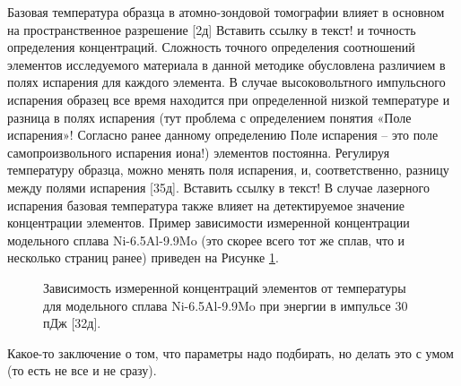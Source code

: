 Базовая температура образца в атомно-зондовой томографии влияет в основном на пространственное разрешение [2д] Вставить ссылку в текст! и точность определения концентраций. Сложность точного определения соотношений элементов исследуемого материала в данной методике обусловлена различием в полях испарения для каждого элемента. В случае высоковольтного импульсного испарения образец все время находится при определенной низкой температуре и разница в полях испарения (тут проблема с определением понятия «Поле испарения»! Согласно ранее данному определению Поле испарения – это поле самопроизвольного испарения иона!) элементов постоянна. Регулируя температуру образца, можно менять поля испарения, и, соответственно, разницу между полями испарения [35д]. Вставить ссылку в текст!
В случае лазерного испарения базовая температура также влияет на детектируемое значение концентрации элементов. Пример зависимости измеренной концентрации модельного сплава Ni-6.5Al-9.9Mo (это скорее всего тот же сплав, что и несколько страниц ранее) приведен на Рисунке \cref{fig:ParamsTemperatureComposition}.

\begin{figure}[htb]
	\caption{Зависимость измеренной концентраций элементов от температуры для модельного сплава Ni-6.5Al-9.9Mo при энергии в импульсе 30 пДж [32д]. }
	\label{fig:ParamsTemperatureComposition}
\end{figure}



\FloatBarrier

Какое-то заключение о том, что параметры надо подбирать, но делать это с умом (то есть не все и не сразу).


























